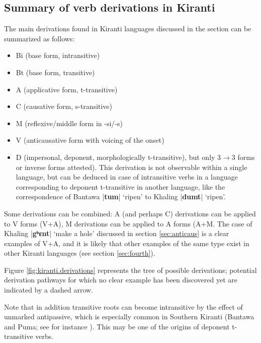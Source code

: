 \documentclass[oneside,a4paper,11pt]{article}
\newcommand{\ipa}[1]{\textbf{{\phon\mbox{#1}}}} %
\newcommand{\dhatu}[2]{|\ipa{#1}| `#2'}
\begin{document}
\subsection{Summary of verb derivations in Kiranti}
The main derivations found in Kiranti languages discussed in the section can be summarized as follows:

\begin{itemize}
\item  Bi (base form, intransitive)
\item  Bt (base form, transitive)
\item  A (applicative form, t-transitive)
\item  C (causative form, s-transitive)
\item M (reflexive/middle form in -si/-s)
\item V (anticausative form with voicing of the onset)
\item D (impersonal, deponent, morphologically t-transitive), but only 3$\rightarrow$3 forms or inverse forms attested). This derivation is not observable within a single language, but can be deduced in case of intransitive verbs in a language corresponding to deponent t-transitive in another language, like  the correspondence of Bantawa \dhatu{tum}{ripen} to Khaling \dhatu{dumt}{ripen}.
\end{itemize}

Some derivations can be combined: A (and perhaps C) derivations can be applied to V forms (V+A), M derivations can be applied to A forms (A+M. The case of Khaling \dhatu{gʰɛnt}{make a hole} discussed in section \ref{sec:anticaus} is a clear examples of V+A, and it is likely that other examples of the same type exist in other Kiranti languages (see section \ref{sec:fourth}). 

Figure \ref{fig:kiranti.derivations} represents the tree of possible derivations; potential derivation pathways for which no clear example has been discovered yet are indicated by a dashed arrow. 

Note that in addition transitive roots can become intransitive by the effect of unmarked antipassive, which is especially common in Southern Kiranti (Bantawa and Puma; see for instance \citealt{bickel07puma}). This may be one of the origins of deponent t-transitive verbs.
\end{document}
